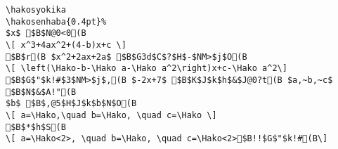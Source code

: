 \begin{verbatim}
\hakosyokika
\hakosenhaba{0.4pt}%
$x$ $B$N@0<0(B
\[ x^3+4ax^2+(4-b)x+c \]
$B$r(B $x^2+2ax+2a$ $B$G3d$C$?$H$-$NM>$j$O(B
\[ \left(\Hako-b-\Hako a-\Hako a^2\right)x+c-\Hako a^2\]
$B$G$"$k!#$3$NM>$j$,(B $-2x+7$ $B$K$J$k$h$&$J@0?t(B $a,~b,~c$ $B$N$&$A!"(B
$b$ $B$,@5$H$J$k$b$N$O(B
\[ a=\Hako,\quad b=\Hako, \quad c=\Hako \]
$B$*$h$S(B
\[ a=\Hako<2>, \quad b=\Hako, \quad c=\Hako<2>$B!!$G$"$k!#(B\]
\end{verbatim}
